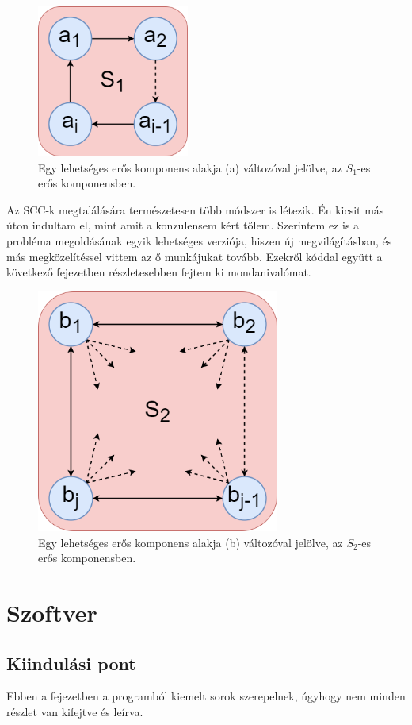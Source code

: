 \documentclass[
]{thesis-ekf}
\theoremstyle{definition}
\theoremstyle{remark}
\begin{document}
	\begin{figure}[ht]
		\centering
		\includegraphics[width=5cm]{images/sajat_pelda-altalanos_scck_a}
		\caption{Egy lehetséges erős komponens alakja (a) változóval jelölve, az $ S_1 $-es erős komponensben.}
		\label{abra-sajatpelda-altalanos_scck_a-verzio}
	\end{figure}
	\newpage	
	Az \textsc{SCC}-k megtalálására természetesen több módszer is létezik. Én kicsit más úton indultam el, mint amit a konzulensem kért tőlem. Szerintem ez is a probléma megoldásának egyik lehetséges verziója, hiszen új megvilágításban, és más megközelítéssel vittem az ő munkájukat tovább. Ezekről kóddal együtt a következő fejezetben részletesebben fejtem ki mondanivalómat.
	\begin{figure}[ht]
		\centering
		\includegraphics[width=8cm]{images/sajat_pelda-altalanos_scck_b2}
		\caption{Egy lehetséges erős komponens alakja (b) változóval jelölve, az $ S_2 $-es erős komponensben.}
		\label{abra-sajatpelda-altalanos_scck_b-verzio}
	\end{figure}
	
\chapter{Szoftver}
	\section{Kiindulási pont}
	Ebben a fejezetben a programból kiemelt sorok szerepelnek, úgyhogy nem minden részlet van kifejtve és leírva.
	
\end{document}
